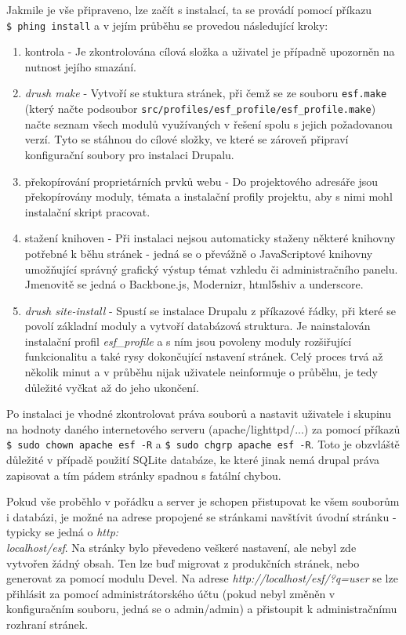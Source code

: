 Jakmile je vše připraveno, lze začít s instalací, ta se provádí pomocí příkazu \texttt{\$~phing install} a v jejím průběhu se provedou následující kroky:

\begin{enumerate}
  \item kontrola - Je zkontrolována cílová složka a uživatel je případně upozorněn na nutnost jejího smazání.
  \item \emph{drush make} - Vytvoří se stuktura stránek, při čemž se ze souboru \texttt{esf.make} (který načte podsoubor \texttt{src/profiles/esf\_profile/esf\_profile.make}) načte seznam všech modulů využívaných v řešení spolu s jejich požadovanou verzí. Tyto se stáhnou do cílové složky, ve které se zároveň připraví konfigurační soubory pro instalaci Drupalu.
  \item překopírování proprietárních prvků webu - Do projektového adresáře jsou překopírovány moduly, témata a instalační profily projektu, aby s nimi mohl instalační skript pracovat.
  \item stažení knihoven - Při instalaci nejsou automaticky staženy některé knihovny potřebné k běhu stránek - jedná se o převážně o JavaScriptové knihovny umožňující správný grafický výstup témat vzhledu či administračního panelu. Jmenovitě se jedná o Backbone.js, Modernizr, html5shiv a underscore.
  \item \emph{drush site-install} - Spustí se instalace Drupalu z příkazové řádky, při které se povolí základní moduly a vytvoří databázová struktura. Je nainstalován instalační profil \emph{esf\_profile} a s ním jsou povoleny moduly rozšiřující funkcionalitu a také rysy dokončující nstavení stránek. Celý proces trvá až několik minut a v průběhu nijak uživatele neinformuje o průběhu, je tedy důležité vyčkat až do jeho ukončení.
\end{enumerate}

Po instalaci je vhodné zkontrolovat práva souborů a nastavit uživatele i skupinu na hodnoty daného internetového serveru (apache/lighttpd/...) za pomocí příkazů \texttt{\$~sudo~chown~apache~esf~-R} a \texttt{\$~sudo~chgrp~apache~esf~-R}. Toto je obzvláště důležité v případě použití SQLite databáze, ke které jinak nemá drupal práva zapisovat a tím pádem stránky spadnou s fatální chybou. 

Pokud vše proběhlo v pořádku a server je schopen přistupovat ke všem souborům i databázi, je možné na adrese propojené se stránkami navštívit úvodní stránku - typicky se jedná o \emph{http:\\localhost/esf}. Na stránky bylo převedeno veškeré nastavení, ale nebyl zde vytvořen žádný obsah. Ten lze buď migrovat z produkčních stránek, nebo generovat za pomocí modulu Devel. Na adrese \emph{http://localhost/esf/?q=user} se lze přihlásit za pomocí administrátorského účtu (pokud nebyl změněn v konfiguračním souboru, jedná se o admin/admin) a přistoupit k administračnímu rozhraní stránek.

